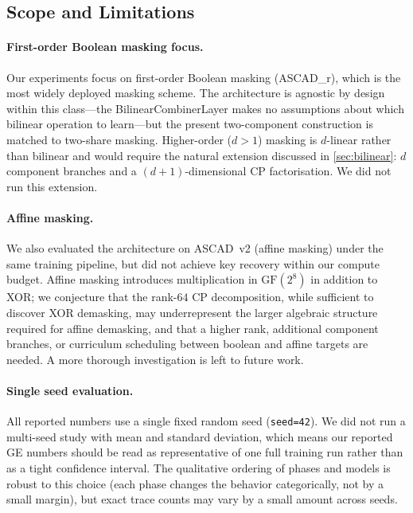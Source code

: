 \documentclass[runningheads]{llncs}
\newcommand{\GF}{\mathrm{GF}}
\begin{document}
\subsection{Scope and Limitations}

\paragraph{First-order Boolean masking focus.}
Our experiments focus on first-order Boolean masking (ASCAD\_r), which is the most widely deployed masking scheme.
The architecture is agnostic by design within this class---the BilinearCombinerLayer makes no assumptions about which bilinear operation to learn---but the present two-component construction is matched to two-share masking.
Higher-order ($d{>}1$) masking is $d$-linear rather than bilinear and would require the natural extension discussed in \cref{sec:bilinear}: $d$ component branches and a $(d{+}1)$-dimensional CP factorisation.
We did not run this extension.

\paragraph{Affine masking.}
We also evaluated the architecture on ASCAD~v2 (affine masking) under the same training pipeline, but did not achieve key recovery within our compute budget.
Affine masking introduces multiplication in $\GF(2^8)$ in addition to XOR; we conjecture that the rank-$64$ CP decomposition, while sufficient to discover XOR demasking, may underrepresent the larger algebraic structure required for affine demasking, and that a higher rank, additional component branches, or curriculum scheduling between boolean and affine targets are needed.
A more thorough investigation is left to future work.

\paragraph{Single seed evaluation.}
All reported numbers use a single fixed random seed (\texttt{seed=42}).
We did not run a multi-seed study with mean and standard deviation, which means our reported GE numbers should be read as representative of one full training run rather than as a tight confidence interval.
The qualitative ordering of phases and models is robust to this choice (each phase changes the behavior categorically, not by a small margin), but exact trace counts may vary by a small amount across seeds.
\end{document}
